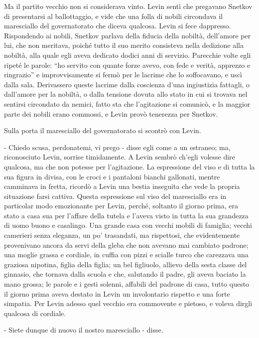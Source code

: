 Ma il partito vecchio non si considerava vinto. Levin sentì che pregavano Snetkov di presentarsi al ballottaggio, e vide che una folla di nobili circondava il maresciallo del governatorato che diceva qualcosa. Levin si fece dappresso. Rispondendo ai nobili, Snetkov parlava della fiducia della nobiltà, dell'amore per lui, che non meritava, poiché tutto il suo merito consisteva nella dedizione alla nobiltà, alla quale egli aveva dedicato dodici anni di servizio. Parecchie volte egli ripeté le parole: ``ho servito con quante forze avevo, con fede e verità, apprezzo e ringrazio'' e improvvisamente si fermò per le lacrime che lo soffocavano, e uscì dalla sala. Derivassero queste lacrime dalla coscienza d'una ingiustizia fattagli, o dall'amore per la nobiltà, o dalla tensione dovuta allo stato in cui si trovava nel sentirsi circondato da nemici, fatto sta che l'agitazione si comunicò, e la maggior parte dei nobili erano commossi, e Levin provò tenerezza per Snetkov. 

Sulla porta il maresciallo del governatorato si scontrò con Levin. 

- Chiedo scusa, perdonatemi, vi prego - disse egli come a un estraneo; ma, riconosciuto Levin, sorrise timidamente. A Levin sembrò ch'egli volesse dire qualcosa, ma che non potesse per l'agitazione. La espressione del viso e di tutta la sua figura in divisa, con le croci e i pantaloni bianchi gallonati, mentre camminava in fretta, ricordò a Levin una bestia inseguita che vede la propria situazione farsi cattiva. Questa espressione sul viso del maresciallo era in particolar modo emozionante per Levin, perché, soltanto il giorno prima, era stato a casa sua per l'affare della tutela e l'aveva visto in tutta la sua grandezza di uomo buono e casalingo. Una grande casa con vecchi mobili di famiglia; vecchi camerieri senza eleganza, un po' trasandati, ma rispettosi, che evidentemente provenivano ancora da servi della gleba che non avevano mai cambiato padrone; una moglie grassa e cordiale, in cuffia con pizzi e scialle turco che carezzava una graziosa nipotina, figlia della figlia; un bel figliuolo, allievo della sesta classe del ginnasio, che tornava dalla scuola e che, salutando il padre, gli aveva baciato la mano grossa; le parole e i gesti solenni, affabili del padrone di casa, tutto questo il giorno prima aveva destato in Levin un involontario rispetto e una forte simpatia. Per Levin adesso quel vecchio era commovente e pietoso, e voleva dirgli qualcosa di cordiale. 

- Siete dunque di nuovo il nostro maresciallo - disse. 

